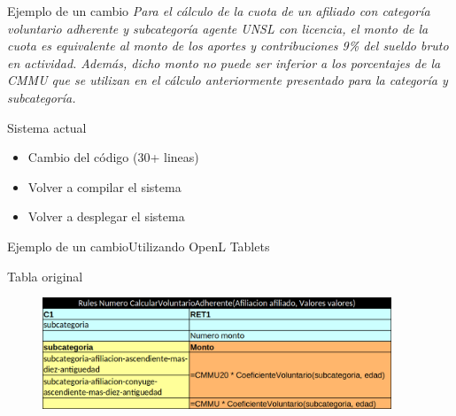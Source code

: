 \documentclass[10pt]{beamer}
\begin{document}
\begin{frame}{Ejemplo de un cambio}
    \emph{
    Para el cálculo de la cuota de un afiliado con categoría voluntario adherente y subcategoría agente UNSL con licencia, el monto de la cuota es equivalente al monto de los aportes y contribuciones 9\% del sueldo bruto en actividad. Además, dicho monto no puede ser inferior a los porcentajes de la CMMU que se utilizan en el cálculo anteriormente presentado para la categoría y subcategoría.
    }
    \begin{block}{Sistema actual}
        \begin{itemize}
            \item Cambio del código (30+ lineas)
            \item Volver a compilar el sistema
            \item Volver a desplegar el sistema
        \end{itemize}
    \end{block}
\end{frame}

\begin{frame}{Ejemplo de un cambio}{Utilizando OpenL Tablets}
    \begin{block}{Tabla original}
        \begin{figure}
            \centering
            \includegraphics[width=0.93\textwidth]{tables/voluntario.png}
        \end{figure}
    \end{block}
\end{frame}

\end{document}
